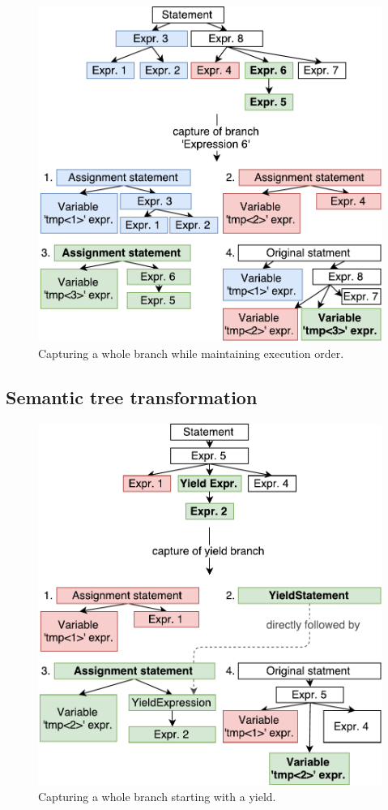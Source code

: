 \begin{figure}[h]
	\centering	
	\includegraphics[scale=0.75]{../img/5_2_captureAllOnPath}	
	\caption{Capturing a whole branch while maintaining execution order.}
	\label{fig5.2:CaptureAllBranch}
\end{figure}

\subsection{Semantic tree transformation}

\begin{figure}[h]
	\centering	
	\includegraphics[scale=0.75]{../img/5_2_yieldCapturing}	
	\caption{Capturing a whole branch starting with a yield.}
	\label{fig5.2:CaptureYield}
\end{figure}

